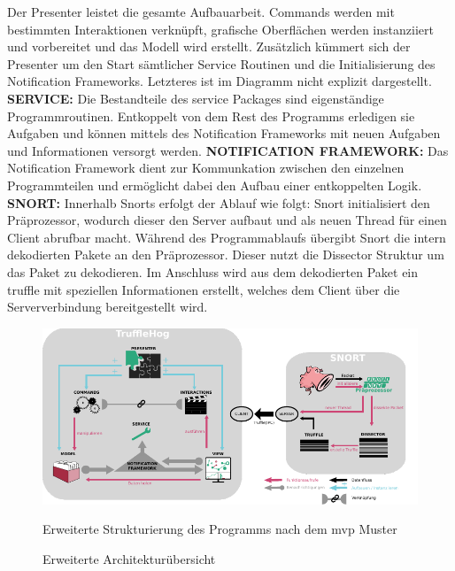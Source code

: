 Der Presenter leistet die gesamte Aufbauarbeit. Commands werden mit bestimmten Interaktionen verknüpft, grafische Oberflächen werden instanziiert und vorbereitet und das Modell wird erstellt. 
Zusätzlich kümmert sich der Presenter um den Start sämtlicher Service Routinen und die Initialisierung des Notification Frameworks. Letzteres ist im Diagramm nicht explizit dargestellt.\newline
 \newline
\textbf{SERVICE:}\newline
Die Bestandteile des service Packages sind eigenständige Programmroutinen. Entkoppelt von dem Rest des Programms erledigen sie Aufgaben und können mittels des Notification Frameworks mit neuen Aufgaben und Informationen versorgt werden.\newline
 \newline
\textbf{NOTIFICATION FRAMEWORK:}\newline
Das Notification Framework dient zur Kommunkation zwischen den einzelnen Programmteilen und ermöglicht dabei den Aufbau einer entkoppelten Logik.\newline
 \newline
\textbf{SNORT:}\newline
Innerhalb Snorts erfolgt der Ablauf wie folgt: Snort initialisiert den Präprozessor, wodurch dieser den Server aufbaut und als neuen Thread für einen Client abrufbar macht. Während des Programmablaufs übergibt Snort die intern dekodierten Pakete an den Präprozessor. Dieser nutzt die Dissector Struktur um das Paket zu dekodieren. Im Anschluss wird aus dem dekodierten Paket ein \gls{truffle} mit speziellen Informationen erstellt, welches dem Client über die Serververbindung bereitgestellt wird.\newline

\begin{figure}
  \centering
  \includegraphics[width=\textwidth]{../diagramimages/arch_diagram_mvp.pdf}
  \caption[Erweiterte Architekturübersicht]{Erweiterte Architekturübersicht}
  \medskip
  Erweiterte Strukturierung des Programms nach dem \gls{mvp} Muster
  \label{fig:arch_diagram}
\end{figure}
\FloatBarrier
